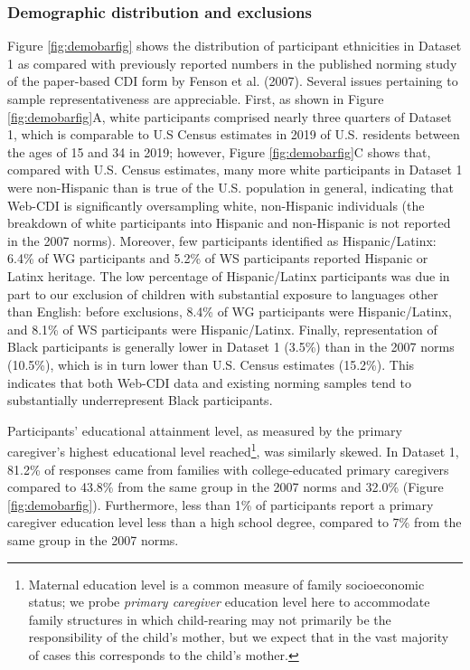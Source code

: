 \documentclass[
  english,
  ,man,floatsintext]{apa6}
\begin{document}
\hypertarget{demographic-distribution-and-exclusions}{%
\subsubsection{Demographic distribution and exclusions}\label{demographic-distribution-and-exclusions}}

Figure \ref{fig:demobarfig} shows the distribution of participant ethnicities in Dataset 1 as compared with previously reported numbers in the published norming study of the paper-based CDI form by Fenson et al. (2007). Several issues pertaining to sample representativeness are appreciable. First, as shown in Figure \ref{fig:demobarfig}A, white participants comprised nearly three quarters of Dataset 1, which is comparable to U.S Census estimates in 2019 of U.S. residents between the ages of 15 and 34 in 2019; however, Figure \ref{fig:demobarfig}C shows that, compared with U.S. Census estimates, many more white participants in Dataset 1 were non-Hispanic than is true of the U.S. population in general, indicating that Web-CDI is significantly oversampling white, non-Hispanic individuals (the breakdown of white participants into Hispanic and non-Hispanic is not reported in the 2007 norms). Moreover, few participants identified as Hispanic/Latinx: 6.4\% of WG participants and 5.2\% of WS participants reported Hispanic or Latinx heritage. The low percentage of Hispanic/Latinx participants was due in part to our exclusion of children with substantial exposure to languages other than English: before exclusions, 8.4\% of WG participants were Hispanic/Latinx, and 8.1\% of WS participants were Hispanic/Latinx. Finally, representation of Black participants is generally lower in Dataset 1 (3.5\%) than in the 2007 norms (10.5\%), which is in turn lower than U.S. Census estimates (15.2\%). This indicates that both Web-CDI data and existing norming samples tend to substantially underrepresent Black participants.

Participants' educational attainment level, as measured by the primary caregiver's highest educational level reached\footnote{Maternal education level is a common measure of family socioeconomic status; we probe \emph{primary caregiver} education level here to accommodate family structures in which child-rearing may not primarily be the responsibility of the child's mother, but we expect that in the vast majority of cases this corresponds to the child's mother.}, was similarly skewed. In Dataset 1, 81.2\% of responses came from families with college-educated primary caregivers compared to 43.8\% from the same group in the 2007 norms and 32.0\% (Figure \ref{fig:demobarfig}). Furthermore, less than 1\% of participants report a primary caregiver education level less than a high school degree, compared to 7\% from the same group in the 2007 norms.
\end{document}
